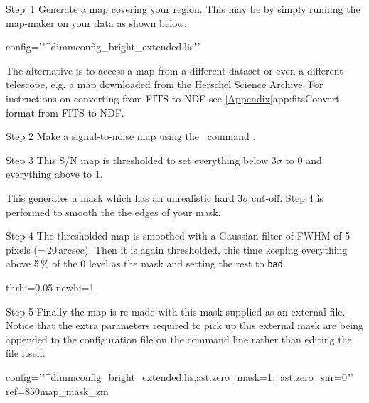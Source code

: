 \begin{aligndesc}
\item[Step~1] Generate a map covering your region. This may be by
  simply running the map-maker on your data as shown below.
\begin{terminalv}
config='"^dimmconfig_bright_extended.lis"'
\end{terminalv}
The alternative is to access a map from a different dataset or even a
different telescope, e.g. a map downloaded from the Herschel Science
Archive. For instructions on converting from FITS to NDF see
\cref{Appendix}{app:fits}{Convert format from FITS to NDF}.\\

\item[Step 2] Make a signal-to-noise map using the \Kappa\ command
  \makesnr.
\begin{terminalv}
\end{terminalv}

\item[Step 3] This S/N map is thresholded to set everything below
  3$\sigma$ to 0 and everything above to 1.
\begin{terminalv}
\end{terminalv}
This generates a mask which has an unrealistic hard 3$\sigma$
cut-off. Step 4 is performed to smooth the the edges of your mask.

\item[Step 4] The thresholded map is smoothed with a Gaussian filter
  of FWHM of 5 pixels (=\,20\,arcsec). Then it is again thresholded,
  this time keeping everything above 5\,\% of the 0 level as the mask
  and setting the rest to \texttt{bad}.
\begin{terminalv}
  thrhi=0.05 newhi=1
\end{terminalv}

\item[Step 5] Finally the map is re-made with this mask supplied as an
  external file. Notice that the extra parameters required to pick up
  this external mask are being appended to the configuration file on
  the command line rather than editing the file itself.
\begin{terminalv}
  config='"^dimmconfig_bright_extended.lis,ast.zero_mask=1,\
  ast.zero_snr=0"' ref=850map_mask_zm
\end{terminalv}

\end{aligndesc}

